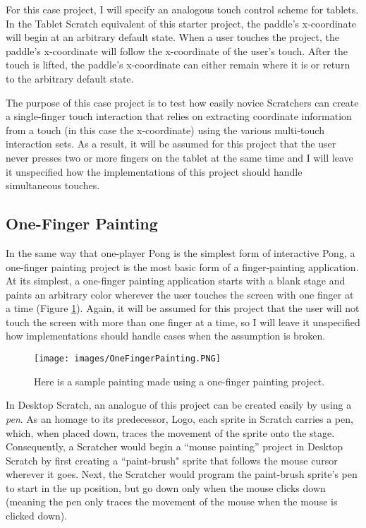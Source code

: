 For this case project, I will specify an analogous touch control scheme for tablets. In the Tablet Scratch equivalent of this starter project, the paddle's x-coordinate will begin at an arbitrary default state. When a user touches the project, the paddle's x-coordinate will follow the x-coordinate of the user's touch. After the touch is lifted, the paddle's x-coordinate can either remain where it is or return to the arbitrary default state. 

The purpose of this case project is to test how easily novice Scratchers can create a single-finger touch interaction that relies on extracting coordinate information from a touch (in this case the x-coordinate) using the various multi-touch interaction sets. As a result, it will be assumed for this project that the user never presses two or more fingers on the tablet at the same time and I will leave it unspecified how the implementations of this project should handle simultaneous touches.

\subsection{One-Finger Painting}
In the same way that one-player Pong is the simplest form of interactive Pong, a one-finger painting project is the most basic form of a finger-painting application. At its simplest, a one-finger painting application starts with a blank stage and paints an arbitrary color wherever the user touches the screen with one finger at a time (Figure \ref{OneFingerPainting}). Again, it will be assumed for this project that the user will not touch the screen with more than one finger at a time, so I will leave it unspecified how implementations should handle cases when the assumption is broken.

\begin{figure}
\centering
\texttt{[image: images/OneFingerPainting.PNG]}
\caption[One-Finger Painting Screenshot]
{Here is a sample painting made using a one-finger painting project.}
\label{OneFingerPainting}
\end{figure}

In Desktop Scratch, an analogue of this project can be created easily by using a \emph{pen}. As an homage to its predecessor, Logo, each sprite in Scratch carries a pen, which, when placed down, traces the movement of the sprite onto the stage. Consequently, a Scratcher would begin a ``mouse painting'' project in Desktop Scratch by first creating a ``paint-brush" sprite that follows the mouse cursor wherever it goes. Next, the Scratcher would program the paint-brush sprite's pen to start in the up position, but go down only when the mouse clicks down (meaning the pen only traces the movement of the mouse when the mouse is clicked down).

